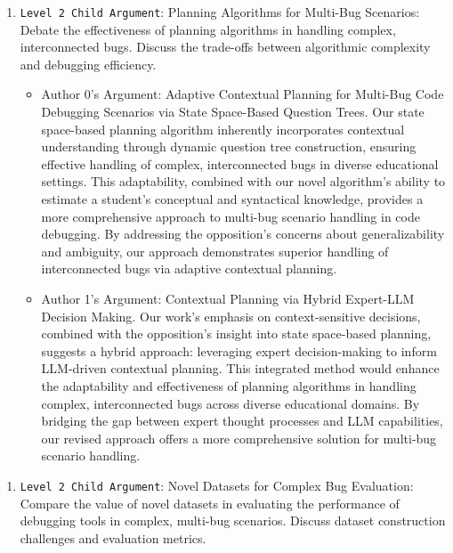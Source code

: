 \begin{enumerate}
    \begin{enumerate}
        \item \texttt{Level 2 Child Argument}: Planning Algorithms for Multi-Bug Scenarios: Debate the effectiveness of planning algorithms in handling complex, interconnected bugs. Discuss the trade-offs between algorithmic complexity and debugging efficiency.
        \begin{itemize}
            \item Author 0's Argument: Adaptive Contextual Planning for Multi-Bug Code Debugging Scenarios via State Space-Based Question Trees. Our state space-based planning algorithm inherently incorporates contextual understanding through dynamic question tree construction, ensuring effective handling of complex, interconnected bugs in diverse educational settings. This adaptability, combined with our novel algorithm's ability to estimate a student's conceptual and syntactical knowledge, provides a more comprehensive approach to multi-bug scenario handling in code debugging. By addressing the opposition's concerns about generalizability and ambiguity, our approach demonstrates superior handling of interconnected bugs via adaptive contextual planning.
		\item Author 1's Argument: Contextual Planning via Hybrid Expert-LLM Decision Making. Our work's emphasis on context-sensitive decisions, combined with the opposition's insight into state space-based planning, suggests a hybrid approach: leveraging expert decision-making to inform LLM-driven contextual planning. This integrated method would enhance the adaptability and effectiveness of planning algorithms in handling complex, interconnected bugs across diverse educational domains. By bridging the gap between expert thought processes and LLM capabilities, our revised approach offers a more comprehensive solution for multi-bug scenario handling.
        \end{itemize}
    \end{enumerate}

    \begin{enumerate}
        \item \texttt{Level 2 Child Argument}: Novel Datasets for Complex Bug Evaluation: Compare the value of novel datasets in evaluating the performance of debugging tools in complex, multi-bug scenarios. Discuss dataset construction challenges and evaluation metrics.


\end{enumerate}
\end{enumerate}
